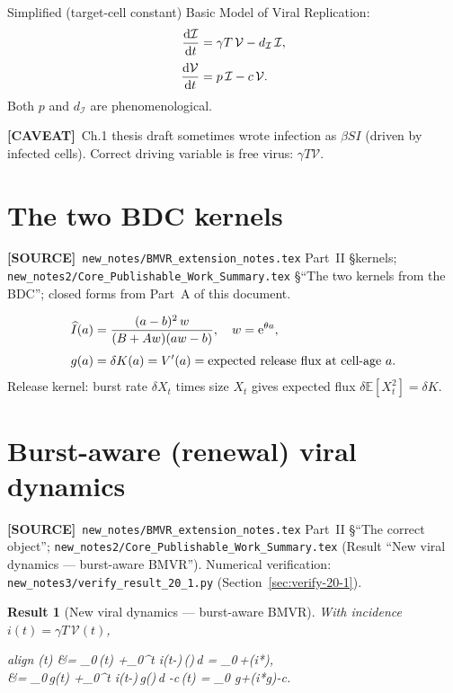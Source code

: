\documentclass[11pt,a4paper]{article}
\newcommand{\dd}{{\rm d}}
\newcommand{\ee}{{\rm e}}
\newcommand{\E}{\mathbb{E}}
\newcommand{\xt}{X_t}
\newcommand{\Ihat}{\widehat{I}}
\newcommand{\Icell}{\mathcal{I}}
\newcommand{\Vfree}{\mathcal{V}}
\newcommand{\ddt}[1]{\frac{\dd #1}{\dd t}}
\newcommand{\Aa}{A}
\newcommand{\Bb}{B}
\theoremstyle{plain}
\newtheorem{result}{Result}[section]
\theoremstyle{definition}
\theoremstyle{remark}
\newcommand{\CAVEAT}{\textcolor{orange!70!black}{\textbf{[CAVEAT]}}}
\newcommand{\SOURCE}{\textcolor{gray!50!black}{\textbf{[SOURCE]}}}
\begin{document}
Simplified (target-cell constant) Basic Model of Viral Replication:
\begin{equation}
\label{eq:BMVR-classical}
\begin{aligned}
\ddt{\Icell}
&= \gamma T\,\Vfree - d_{\Icell}\,\Icell,\\[0.25em]
\ddt{\Vfree}
&= p\,\Icell - c\,\Vfree.
\end{aligned}
\end{equation}
Both $p$ and $d_{\Icell}$ are phenomenological.

\CAVEAT\ Ch.1 thesis draft sometimes wrote infection as $\beta S I$ (driven by
infected cells). Correct driving variable is free virus: $\gamma T\Vfree$.

\section{The two BDC kernels}
\SOURCE\
\texttt{new\_notes/BMVR\_extension\_notes.tex} Part~II \S kernels;
\texttt{new\_notes2/Core\_Publishable\_Work\_Summary.tex}
\S``The two kernels from the BDC'';
closed forms from Part~A of this document.

\begin{equation}
\label{eq:kernels}
\begin{aligned}
\Ihat(a)
&=\frac{(a-b)^2\,w}{(\Bb+\Aa w)(aw-b)},
\quad w=\ee^{\theta a},\\[0.3em]
g(a)
&=\delta K(a)=V'(a)
=\text{expected release flux at cell-age }a.
\end{aligned}
\end{equation}
Release kernel: burst rate $\delta\xt$ times size $\xt$ gives expected flux
$\delta\E[\xt^2]=\delta K$.

\section{Burst-aware (renewal) viral dynamics}
\label{sec:renewal}
\SOURCE\
\texttt{new\_notes/BMVR\_extension\_notes.tex} Part~II \S``The correct object'';
\texttt{new\_notes2/Core\_Publishable\_Work\_Summary.tex}
(Result ``New viral dynamics --- burst-aware BMVR'').
Numerical verification: \texttt{new\_notes3/verify\_result\_20\_1.py}
(Section~\ref{sec:verify-20-1}).

\begin{result}[New viral dynamics --- burst-aware BMVR]
\label{res:new-vde}
With incidence $i(t)=\gamma T\,\Vfree(t)$,
\begin{empheq}[box=\fbox]{align}
\Icell(t)
&= \Icell_0\,\Ihat(t)
+\int_0^t i(t-\alpha)\,\Ihat(\alpha)\,\dd\alpha
= \Icell_0\,\Ihat+(i*\Ihat),
\label{eq:Icell-full}\\[0.4em]
\ddt{\Vfree}
&= \Icell_0\,g(t)
+\int_0^t i(t-\alpha)\,g(\alpha)\,\dd\alpha
-c\,\Vfree(t)
= \Icell_0 g+(i*g)-c\Vfree.
\label{eq:Vfree-full}
\end{empheq}
\end{result}
\end{document}
